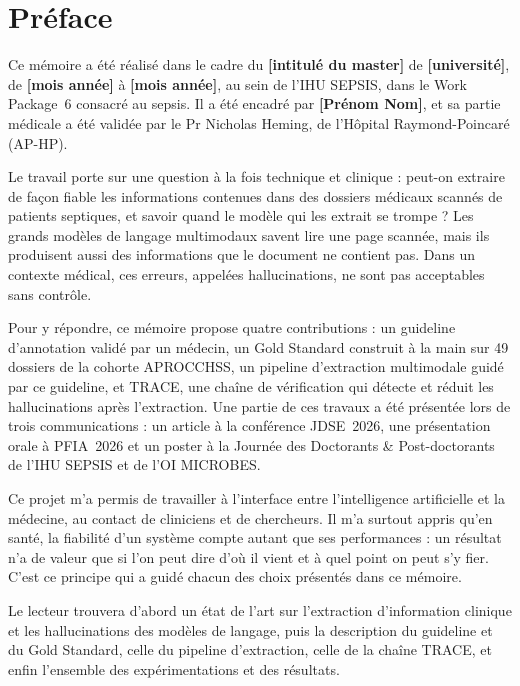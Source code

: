 \chapter*{Préface}

Ce mémoire a été réalisé dans le cadre du \textbf{[intitulé du master]} de \textbf{[université]}, de \textbf{[mois année]} à \textbf{[mois année]}, au sein de l'IHU SEPSIS, dans le Work Package~6 consacré au sepsis. Il a été encadré par \textbf{[Prénom Nom]}, et sa partie médicale a été validée par le Pr Nicholas Heming, de l'Hôpital Raymond-Poincaré (AP-HP).

Le travail porte sur une question à la fois technique et clinique : peut-on extraire de façon fiable les informations contenues dans des dossiers médicaux scannés de patients septiques, et savoir quand le modèle qui les extrait se trompe ? Les grands modèles de langage multimodaux savent lire une page scannée, mais ils produisent aussi des informations que le document ne contient pas. Dans un contexte médical, ces erreurs, appelées hallucinations, ne sont pas acceptables sans contrôle.

Pour y répondre, ce mémoire propose quatre contributions : un guideline d'annotation validé par un médecin, un Gold Standard construit à la main sur 49 dossiers de la cohorte APROCCHSS, un pipeline d'extraction multimodale guidé par ce guideline, et TRACE, une chaîne de vérification qui détecte et réduit les hallucinations après l'extraction. Une partie de ces travaux a été présentée lors de trois communications : un article à la conférence JDSE~2026, une présentation orale à PFIA~2026 et un poster à la Journée des Doctorants \& Post-doctorants de l'IHU SEPSIS et de l'OI MICROBES.

Ce projet m'a permis de travailler à l'interface entre l'intelligence artificielle et la médecine, au contact de cliniciens et de chercheurs. Il m'a surtout appris qu'en santé, la fiabilité d'un système compte autant que ses performances : un résultat n'a de valeur que si l'on peut dire d'où il vient et à quel point on peut s'y fier. C'est ce principe qui a guidé chacun des choix présentés dans ce mémoire.

Le lecteur trouvera d'abord un état de l'art sur l'extraction d'information clinique et les hallucinations des modèles de langage, puis la description du guideline et du Gold Standard, celle du pipeline d'extraction, celle de la chaîne TRACE, et enfin l'ensemble des expérimentations et des résultats.
